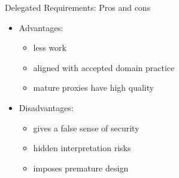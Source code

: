 \begin{Slide}{Delegated Requirements: Pros and cons}
\begin{itemize}
\item Advantages:
\begin{itemize}
\item less work
\item aligned with accepted domain practice
\item mature proxies have high quality

\end{itemize}
\item Disadvantages:
\begin{itemize}
\item gives a false sense of security
\item hidden interpretation risks
\item imposes premature design


\end{itemize}
\end{itemize}
\end{Slide}